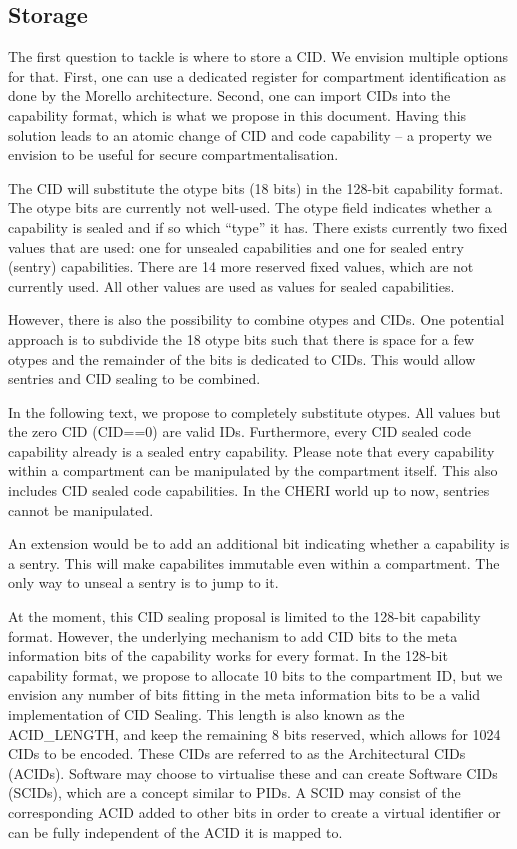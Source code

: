 \subsection{Storage}
\label{subsec:storage}

The first question to tackle is where to store a CID. We envision multiple options for that.
First, one can use a dedicated register for compartment identification as done by the Morello architecture.
Second, one can import CIDs into the capability format, which is what we propose in this document.
Having this solution leads to an atomic change of CID and code capability -- a property we envision to be useful for secure compartmentalisation.

The CID will substitute the otype bits (18 bits) in the 128-bit capability format.
The otype bits are currently not well-used. The otype field indicates whether a capability is sealed and if so which “type” it has.
There exists currently two fixed values that are used: one for unsealed capabilities and one for sealed entry (sentry) capabilities.
There are 14 more reserved fixed values, which are not currently used. All other values are used as values for sealed capabilities.

However, there is also the possibility to combine otypes and CIDs.
One potential approach is to subdivide the 18 otype bits such that there is space for a few otypes and the remainder of the bits is dedicated to CIDs.
This would allow sentries and CID sealing to be combined.

In the following text, we propose to completely substitute otypes.
All values but the zero CID (CID==0) are valid IDs.
Furthermore, every CID sealed code capability already is a sealed entry capability.
Please note that every capability within a compartment can be manipulated by the compartment itself.
This also includes CID sealed code capabilities.
In the CHERI world up to now, sentries cannot be manipulated.

An extension would be to add an additional bit indicating whether a capability is a sentry.
This will make capabilites immutable even within a compartment.
The only way to unseal a sentry is to jump to it.

At the moment, this CID sealing proposal is limited to the 128-bit capability format.
However, the underlying mechanism to add CID bits to the meta information bits of the capability works for every format.
In the 128-bit capability format, we propose to allocate 10 bits to the compartment ID, but we envision any number of bits fitting in the meta information bits to be a valid implementation of CID Sealing.
This length is also known as the ACID\_LENGTH, and keep the remaining 8 bits reserved, which allows for 1024 CIDs to be encoded.
These CIDs are referred to as the Architectural CIDs (ACIDs).
Software may choose to virtualise these and can create Software CIDs (SCIDs), which are a concept similar to PIDs.
A SCID may consist of the corresponding ACID added to other bits in order to create a virtual identifier or can be fully independent of the ACID it is mapped to.

